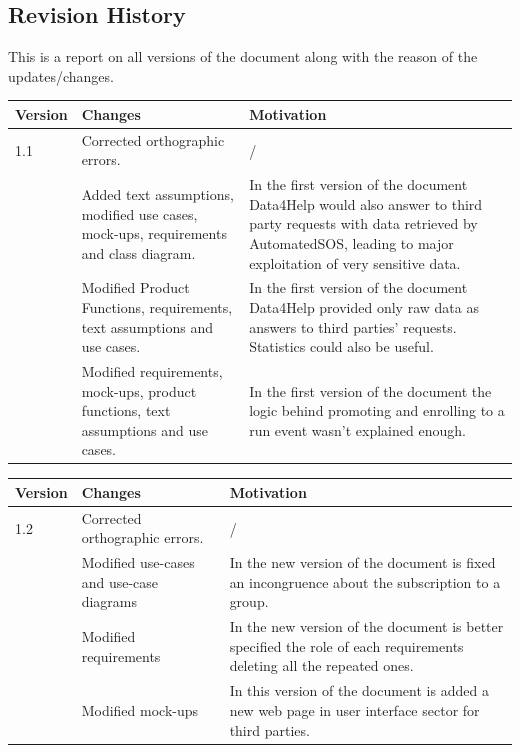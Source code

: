 \newpage
\subsection{Revision History}
This is a report on all versions of the document along with the reason of the updates/changes.

\begin{table}[h]
\begin{tabular}{|l|p{}|p{}|}
\hline
Version & Changes & Motivation\\ \hline
1.1     & Corrected orthographic errors. & / \\ \hline
 & Added text assumptions, modified use cases, mock-ups, requirements and class diagram. & In the first version of the document Data4Help would also answer to third party requests with data retrieved by AutomatedSOS, leading to major exploitation of very sensitive data.   \\ \hline
 & Modified Product Functions, requirements, text assumptions and use cases. & In the first version of the document Data4Help provided only raw data as answers to third parties' requests. Statistics could also be useful.  \\ \hline
 & Modified requirements, mock-ups, product functions, text assumptions and use cases. & In the first version of the document the logic behind promoting and enrolling to a run event wasn't explained enough. \\ \hline
\end{tabular}
\end{table}

\begin{table}[h]
\begin{tabular}{|l|p{}|p{}|}
\hline
Version & Changes & Motivation\\ \hline
1.2     & Corrected orthographic errors. & /  \\ \hline
& Modified use-cases and use-case diagrams & In the new version of the document is fixed an incongruence about the subscription to a group.  \\ \hline
 & Modified requirements & In the new version of the document is better specified the role of each requirements deleting all the repeated ones.   \\ \hline
 & Modified mock-ups & In this version of the document is added a new web page in user interface sector for third parties. \\ \hline
\end{tabular}
\end{table}

